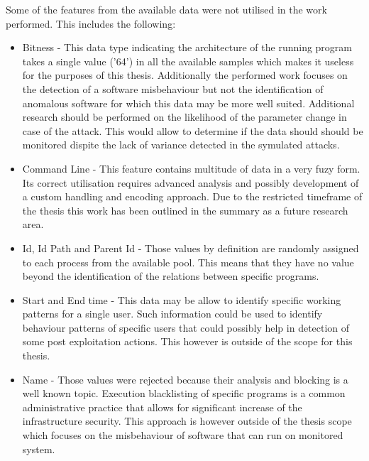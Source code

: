 \documentclass[a4paper,twoside,12pt]{book}
\begin{document}
Some of the features from the available data were not utilised in the work performed. This includes
the following:
\begin{itemize}
	\item Bitness - This data type indicating the architecture of the running program takes a single value ('64')
	in all the available samples which makes it useless for the purposes of this thesis. Additionally the performed
	work focuses on the detection of a software misbehaviour but not the identification of anomalous software 
	for which this data may be more well suited. Additional research should be performed on the likelihood of the
	parameter change in case of the attack. This would allow to determine if the data should should be monitored dispite
	the lack of variance detected in the symulated attacks.
	\item Command Line -  This feature contains multitude of data in a very fuzy form. Its correct utilisation
	requires advanced analysis and possibly development of a custom handling and encoding approach. Due 
	to the restricted timeframe of the thesis this work has been outlined in the summary as a future research
	area.
	\item Id, Id Path and Parent Id - Those values by definition are randomly assigned to each process from the available
	pool. This means that they have no value beyond the identification of the relations between specific programs. 
	\item Start and End time - This data may be allow to identify specific working patterns for a single user. Such 
	information could be used to identify behaviour patterns of specific users that could possibly help
	in detection of some post exploitation actions. This however is outside of the scope for this thesis.
	\item Name - Those values were rejected because their analysis and blocking is a well known topic. Execution 
	blacklisting of specific programs is a common administrative practice that allows for significant increase
	of the infrastructure security. This approach is however outside of the thesis scope which focuses on the 
	misbehaviour of software that can run on monitored system.
\end{itemize}
\end{document}
